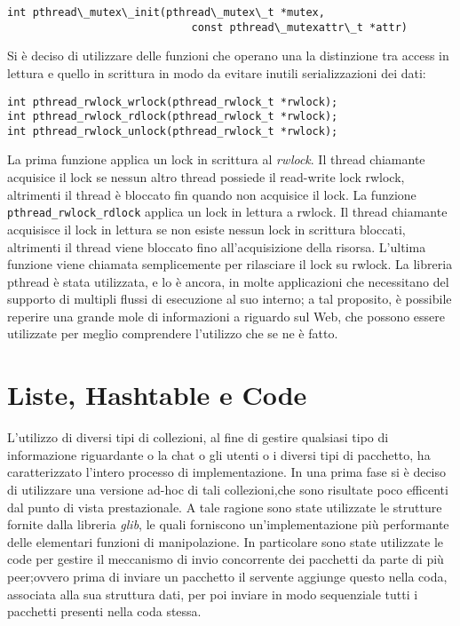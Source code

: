\begin{lstlisting}
int pthread\_mutex\_init(pthread\_mutex\_t *mutex,
                             const pthread\_mutexattr\_t *attr)
\end{lstlisting}
Si è deciso di utilizzare delle funzioni che operano una la distinzione tra access in lettura e quello in scrittura in modo da evitare inutili serializzazioni dei dati:
\begin{lstlisting}
int pthread_rwlock_wrlock(pthread_rwlock_t *rwlock);
int pthread_rwlock_rdlock(pthread_rwlock_t *rwlock);
int pthread_rwlock_unlock(pthread_rwlock_t *rwlock);
\end{lstlisting}
La prima funzione applica un lock in scrittura al \textit{rwlock}. Il thread chiamante acquisice il lock se nessun altro thread possiede il read-write lock rwlock, altrimenti il thread è bloccato fin quando non acquisice il lock. La funzione \texttt{pthread\_rwlock\_rdlock} applica un lock in lettura a rwlock. Il thread chiamante acquisisce il lock in lettura se non esiste nessun lock in scrittura bloccati, altrimenti il thread viene bloccato fino all’acquisizione della risorsa. L’ultima funzione viene chiamata semplicemente per rilasciare il lock su rwlock.
La libreria pthread è stata utilizzata, e lo è ancora, in molte applicazioni che necessitano del supporto di multipli flussi di esecuzione al suo interno; a tal proposito, è possibile reperire una grande mole di informazioni a riguardo sul Web, che possono essere utilizzate per meglio comprendere l’utilizzo che se ne è fatto.
\section{Liste, Hashtable e Code}
L'utilizzo di diversi tipi di collezioni, al fine di gestire qualsiasi tipo di informazione riguardante o la chat o gli utenti o i diversi tipi di pacchetto, ha caratterizzato l'intero processo di implementazione.
In una prima fase si è deciso di utilizzare una versione ad-hoc di tali collezioni,che sono risultate poco efficenti dal punto di vista prestazionale. A tale ragione sono state utilizzate le strutture fornite dalla libreria \textit{glib}, le quali forniscono un'implementazione più performante delle elementari funzioni di manipolazione.
In particolare sono state utilizzate le code per gestire il meccanismo di invio concorrente dei pacchetti da parte di più peer;ovvero prima di inviare un pacchetto il servente aggiunge questo nella coda, associata alla sua struttura dati, per poi inviare in modo sequenziale tutti i pacchetti presenti nella coda stessa.
